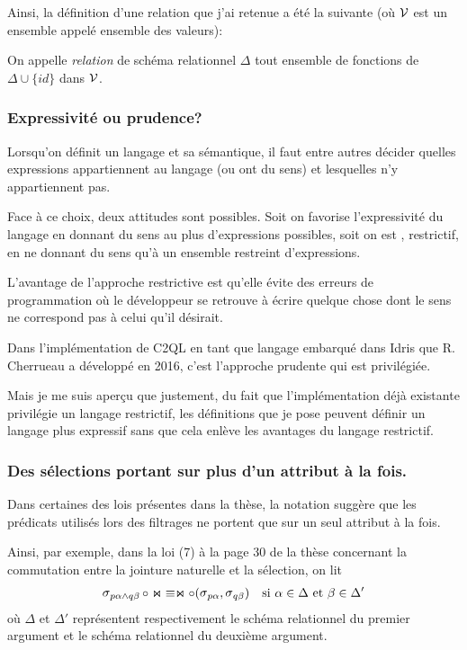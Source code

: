Ainsi, la définition d'une relation que j'ai retenue a été la suivante
(où $\mathcal{V}$ est un ensemble appelé ensemble des valeurs):

\begin{defi*}
	On appelle \emph{relation} de schéma relationnel $\Delta$
	tout ensemble de fonctions de $\Delta \cup \{ id \}$ dans $\mathcal{V}$.
\end{defi*}

\subsubsection*{Expressivité ou prudence?}
Lorsqu'on définit un langage et sa sémantique, il faut entre autres
décider quelles expressions appartiennent au langage
(ou \og ont du sens\fg{}) et lesquelles n'y appartiennent pas.

Face à ce choix, deux attitudes sont possibles.
Soit on favorise l'expressivité du langage en donnant du sens
au plus d'expressions possibles, soit on est , restrictif,
en ne donnant du sens qu'à un ensemble restreint d'expressions.

L'avantage de l'approche restrictive est qu'elle évite des erreurs de programmation
où le développeur se retrouve à écrire quelque chose dont le sens
ne correspond pas à celui qu'il désirait.

Dans l'implémentation de C2QL en tant que langage embarqué dans Idris
que R. Cherrueau a développé en 2016, c'est l'approche
\og prudente \fg{} qui est privilégiée.

Mais je me suis aperçu que justement, du fait que l'implémentation
déjà existante privilégie un langage restrictif,
les définitions que je pose peuvent définir un langage plus
expressif sans que cela enlève
les avantages du langage restrictif.



\subsubsection*{Des sélections portant sur plus d'un attribut à la fois.}
Dans certaines des lois présentes dans la thèse, la notation
suggère que les prédicats utilisés lors des filtrages ne portent que sur
un seul attribut à la fois.

Ainsi, par exemple, dans la loi (7) à la page 30 de la thèse
concernant la commutation entre la jointure naturelle et la
sélection,
on lit
\begin{align*}
\sel_{p\alpha \wedge q\beta} \circ \Join 
& \equiv \Join \circ (\sel_{p\alpha}, \sel_{q\beta})
& \text{si $\alpha \in \Delta$ et $\beta \in \Delta'$}
\end{align*}
où $\Delta$ et $\Delta'$ représentent respectivement le schéma relationnel
du premier argument et le schéma relationnel du deuxième argument.

